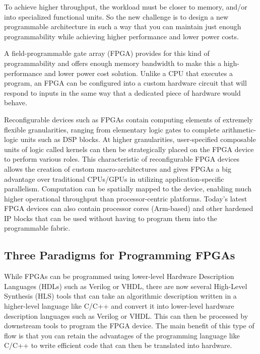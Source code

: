 To achieve higher throughput, the workload must be closer
to memory, and/or into specialized functional units. So the new challenge is to design a new programmable architecture in such a way that you can maintain just enough programmability while achieving higher performance and lower power costs.

\par A field-programmable gate array (FPGA) provides for this kind of programmability and offers enough memory bandwidth to make this a high-performance and lower power cost solution. Unlike a CPU that executes a program, an FPGA can be configured into a custom hardware circuit that will respond to inputs in the same way that a dedicated piece of hardware would behave.

\par Reconfigurable devices such as FPGAs contain computing elements of extremely flexible granularities, ranging from elementary logic gates to complete arithmetic-logic units such as DSP blocks. At higher granularities, user-specified composable units of logic called kernels can then be strategically placed on the FPGA device to perform various roles. This characteristic of reconfigurable FPGA devices allows the creation of custom macro-architectures and gives FPGAs a big advantage over traditional CPUs/GPUs in utilizing application-specific parallelism. Computation can be spatially mapped to the device, enabling much higher operational throughput than processor-centric platforms. Today's latest FPGA devices can also contain processor cores (Arm-based) and other hardened IP blocks that can be used without having to program them into the programmable fabric.

\subsection{Three Paradigms for Programming FPGAs}

While FPGAs can be programmed using lower-level Hardware Description Languages (HDLs) such as Verilog or VHDL, there are now several High-Level Synthesis (HLS) tools that can take an algorithmic description written in a higher-level language like C/C++ and convert it into lower-level hardware description languages such as Verilog or VHDL. This can then be processed by downstream tools to program the FPGA device. The main benefit of this type of flow is that you
can retain the advantages of the programming language like C/C++ to write efficient code that can then be translated into hardware. 

